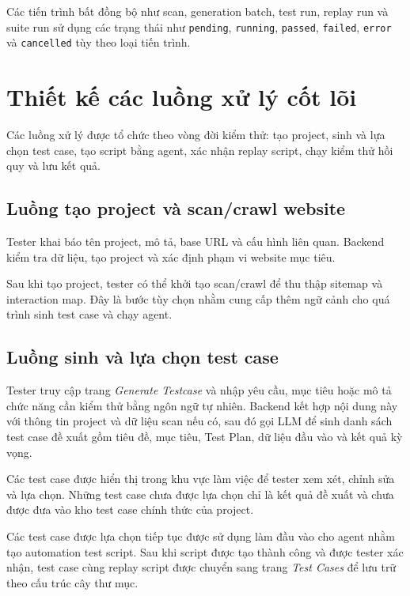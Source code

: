 Các tiến trình bất đồng bộ như scan, generation batch, test run, replay run và suite run sử dụng các trạng thái như \texttt{pending}, \texttt{running}, \texttt{passed}, \texttt{failed}, \texttt{error} và \texttt{cancelled} tùy theo loại tiến trình.

\section{Thiết kế các luồng xử lý cốt lõi}

Các luồng xử lý được tổ chức theo vòng đời kiểm thử: tạo project, sinh và lựa chọn test case, tạo script bằng agent, xác nhận replay script, chạy kiểm thử hồi quy và lưu kết quả.

\subsection{Luồng tạo project và scan/crawl website}

Tester khai báo tên project, mô tả, base URL và cấu hình liên quan. Backend kiểm tra dữ liệu, tạo project và xác định phạm vi website mục tiêu.

Sau khi tạo project, tester có thể khởi tạo scan/crawl để thu thập sitemap và interaction map. Đây là bước tùy chọn nhằm cung cấp thêm ngữ cảnh cho quá trình sinh test case và chạy agent.

\subsection{Luồng sinh và lựa chọn test case}

Tester truy cập trang \textit{Generate Testcase} và nhập yêu cầu, mục tiêu hoặc mô tả chức năng cần kiểm thử bằng ngôn ngữ tự nhiên. Backend kết hợp nội dung này với thông tin project và dữ liệu scan nếu có, sau đó gọi LLM để sinh danh sách test case đề xuất gồm tiêu đề, mục tiêu, Test Plan, dữ liệu đầu vào và kết quả kỳ vọng.

Các test case được hiển thị trong khu vực làm việc để tester xem xét, chỉnh sửa và lựa chọn. Những test case chưa được lựa chọn chỉ là kết quả đề xuất và chưa được đưa vào kho test case chính thức của project.

Các test case được lựa chọn tiếp tục được sử dụng làm đầu vào cho agent nhằm tạo automation test script. Sau khi script được tạo thành công và được tester xác nhận, test case cùng replay script được chuyển sang trang \textit{Test Cases} để lưu trữ theo cấu trúc cây thư mục.

